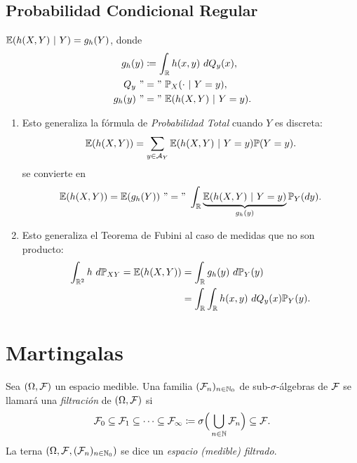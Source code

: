 
\section{Probabilidad Condicional Regular}

$\mathbb{E}(h(X,Y) \ | \ Y) = g_{h}(Y)$, donde
\begin{align*}
	g_{h}(y) &\coloneq \int_{\mathbb{R}} h(x,y) \ dQ_{y}(x), \\
	Q_{y} \ "&=" \ \mathbb{P}_{X}( \cdot \ | \ Y = y), \\
	g_{h}(y) \ "&=" \ \mathbb{E}(h(X,Y) \ | \ Y = y)
.\end{align*}

\begin{remark}
	\begin{enumerate}
		\item Esto generaliza la fórmula de \textit{Probabilidad Total} cuando $Y$ es discreta:
		\[ \mathbb{E}(h(X,Y)) = \sum_{y \in \mathcal{A}_{Y}} \mathbb{E}(h(X,Y) \ | \ Y = y) \mathbb{P}(Y = y). \]
		se convierte en
		\[ \mathbb{E}(h(X,Y)) = \mathbb{E}(g_{h}(Y)) \ "=" \ \int_{\mathbb{R}} \underbrace{\mathbb{E}(h(X,Y) \ | \ Y = y)}_{g_{h}(y)} \mathbb{P}_{Y}(dy). \]
	
		\item Esto generaliza el Teorema de Fubini al caso de medidas que no son producto:
		\begin{align*}
			\int_{\mathbb{R}^{2}} h \ d\mathbb{P}_{XY} = \mathbb{E}(h(X,Y)) &= \int_{\mathbb{R}} g_{h}(y) \ d\mathbb{P}_{Y}(y) \\
			&= \int_{\mathbb{R}} \int_{\mathbb{R}} h(x,y) \ dQ_{y}(x) \mathbb{P}_{Y}(y)
		.\end{align*}
	\end{enumerate}
\end{remark}

\chapter{Martingalas}

\begin{definition}
	Sea $(\Omega, \mathcal{F})$ un espacio medible. Una familia $(\mathcal{F}_{n})_{n \in \mathbb{N}_{0}}$ de sub-$\sigma$-álgebras de $\mathcal{F}$ se llamará una \textit{filtración} de $(\Omega, \mathcal{F})$ si
	\[ \mathcal{F}_{0} \subseteq \mathcal{F}_{1} \subseteq \cdots \subseteq \mathcal{F}_{\infty} \coloneq \sigma \Big( \bigcup_{n \in \mathbb{N}} \mathcal{F}_{n} \Big) \subseteq \mathcal{F}. \]
	La terna $(\Omega, \mathcal{F}, (\mathcal{F}_{n})_{n \in \mathbb{N}_{0}})$ se dice un \textit{espacio (medible) filtrado}.
\end{definition}

